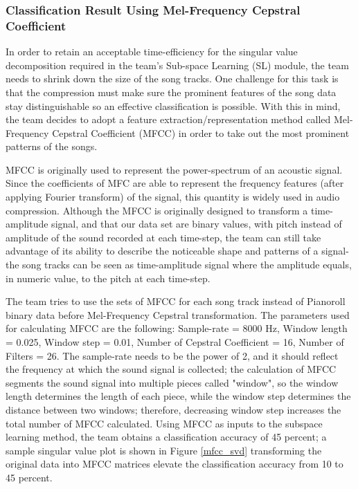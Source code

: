 \begin{par}
    \subsubsection{Classification Result Using Mel-Frequency Cepstral Coefficient}
    \par \hspace{15pt} In order to retain an acceptable time-efficiency for the singular value decomposition required in the team's Sub-space Learning (SL) module, the team needs to shrink down the size of the song tracks. One challenge for this task is that the compression must make sure the prominent features of the song data stay distinguishable so an effective classification is possible. With this in mind, the team decides to adopt a feature extraction/representation method called Mel-Frequency Cepstral Coefficient (MFCC) in order to take out the most prominent patterns of the songs.
    \par MFCC is originally used to represent the power-spectrum of an acoustic signal. Since the coefficients of MFC are able to represent the frequency features (after applying Fourier transform) of the signal, this quantity is widely used in audio compression. Although the MFCC is originally designed to transform a time-amplitude signal, and that our data set are binary values, with pitch instead of amplitude of the sound recorded at each time-step, the team can still take advantage of its ability to describe the noticeable shape and patterns of a signal-the song tracks can be seen as time-amplitude signal where the amplitude equals, in numeric value, to the pitch at each time-step.
    \par The team tries to use the sets of MFCC for each song track instead of Pianoroll binary data before Mel-Frequency Cepstral transformation. The parameters used for calculating MFCC are the following: Sample-rate = 8000 Hz, Window length = 0.025, Window step = 0.01, Number of Cepstral Coefficient = 16, Number of Filters = 26. The sample-rate needs to be the power of 2, and it should reflect the frequency at which the sound signal is collected; the calculation of MFCC segments the sound signal into multiple pieces called "window", so the window length determines the length of each piece, while the window step determines the distance between two windows; therefore, decreasing window step increases the total number of MFCC calculated. Using MFCC as inputs to the subspace learning method, the team obtains a classification accuracy of 45 percent; a sample singular value plot is shown in Figure \ref{mfcc_svd} transforming the original data into MFCC matrices elevate the classification accuracy from 10 to 45 percent.

\end{par}
